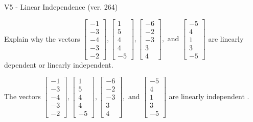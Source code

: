 \begin{exercise}
  \begin{exerciseTitle}V5 - Linear Independence (ver. 264)\end{exerciseTitle}
  \begin{exerciseStatement}
    Explain why the vectors \(\left[\begin{array}{r}
-1 \\
-3 \\
-4 \\
-3 \\
-2
\end{array}\right] , \left[\begin{array}{r}
1 \\
5 \\
4 \\
4 \\
-5
\end{array}\right] , \left[\begin{array}{r}
-6 \\
-2 \\
-3 \\
3 \\
4
\end{array}\right] , \text{ and } \left[\begin{array}{r}
-5 \\
4 \\
1 \\
3 \\
-5
\end{array}\right]\) are linearly dependent or linearly independent.	


  \end{exerciseStatement}
  \begin{exerciseAnswer}
   The vectors \(\left[\begin{array}{r}
-1 \\
-3 \\
-4 \\
-3 \\
-2
\end{array}\right] , \left[\begin{array}{r}
1 \\
5 \\
4 \\
4 \\
-5
\end{array}\right] , \left[\begin{array}{r}
-6 \\
-2 \\
-3 \\
3 \\
4
\end{array}\right] , \text{ and } \left[\begin{array}{r}
-5 \\
4 \\
1 \\
3 \\
-5
\end{array}\right]\) are 
  	 linearly independent  .
  


  \end{exerciseAnswer}
\end{exercise}